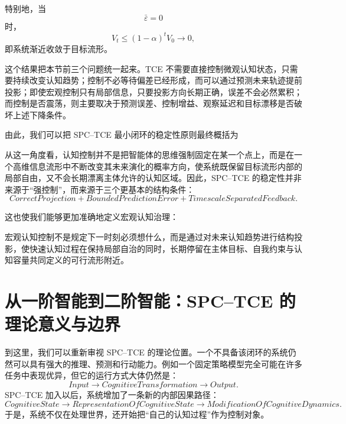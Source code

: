 特别地，当
\[
\bar\varepsilon=0
\]
时，
\[
V_t
\le
(1-\alpha)^tV_0
\rightarrow0,
\]
即系统渐近收敛于目标流形。

这个结果把本节前三个问题统一起来。TCE 不需要直接控制微观认知状态，只需要持续改变认知趋势；控制不必等待偏差已经形成，而可以通过预测未来轨迹提前投影；即使宏观控制只有局部信息，只要投影方向长期正确，误差不会必然累积；而控制是否震荡，则主要取决于预测误差、控制增益、观察延迟和目标漂移是否破坏上述下降条件。

由此，我们可以把 SPC--TCE 最小闭环的稳定性原则最终概括为
\begin{statementbox}
\centering
{}
\end{statementbox}

从这一角度看，认知控制并不是把智能体的思维强制固定在某一个点上，而是在一个高维信息流形中不断改变其未来演化的概率方向，使系统既保留目标流形内部的局部自由，又不会长期漂离主体允许的认知区域。因此，SPC--TCE 的稳定性并非来源于``强控制''，而来源于三个更基本的结构条件：
\[
\boxed{
CorrectProjection
+
BoundedPredictionError
+
TimescaleSeparatedFeedback.
}
\]

这也使我们能够更加准确地定义宏观认知治理：
\begin{definition*}
宏观认知控制不是规定下一时刻必须想什么，而是通过对未来认知趋势进行结构投影，使快速认知过程在保持局部自治的同时，长期停留在主体目标、自我约束与认知容量共同定义的可行流形附近。
\end{definition*}


\section{从一阶智能到二阶智能：SPC--TCE 的理论意义与边界}

到这里，我们可以重新审视 SPC--TCE 的理论位置。一个不具备该闭环的系统仍然可以具有强大的推理、预测和行动能力。例如一个固定策略模型完全可能在许多任务中表现优异，但它的运行方式大体仍然是：
\begin{equation}
Input
\rightarrow
CognitiveTransformation
\rightarrow
Output.
\end{equation}
SPC--TCE 加入以后，系统增加了一条新的内部因果路径：
\begin{equation}
CognitiveState
\rightarrow
RepresentationOfCognitiveState
\rightarrow
ModificationOfCognitiveDynamics.
\end{equation}
于是，系统不仅在处理世界，还开始把``自己的认知过程''作为控制对象。

